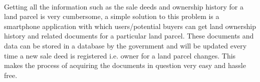 \documentclass{article}
\begin{document}
        \paragraph{}
        Getting all the information such as the sale deeds and ownership history for a land parcel is very cumbersome, a simple solution to this problem is a smartphone application with which users/potential buyers can get land ownership history and related documents for a particular land parcel. These documents and data can be stored in a database by the government and will be updated every time a new sale deed is registered i.e. owner for a land parcel changes. This makes the process of acquiring the documents in question very easy and hassle free.
\end{document}
